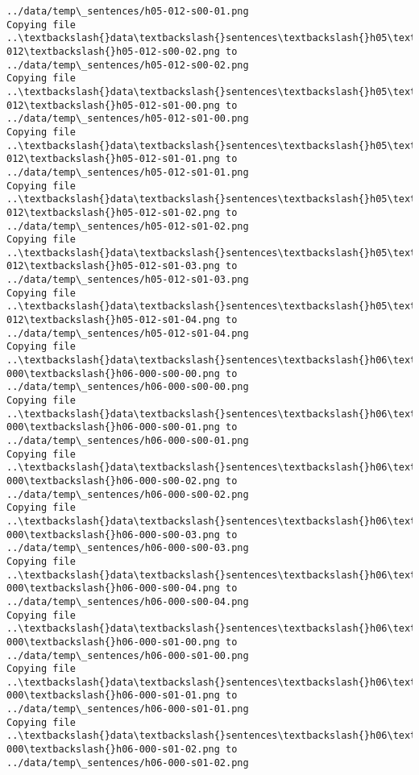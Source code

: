 \documentclass[11pt]{article}
\begin{document}
\begin{Verbatim}[commandchars=\\\{\}]
../data/temp\_sentences/h05-012-s00-01.png
Copying file ..\textbackslash{}data\textbackslash{}sentences\textbackslash{}h05\textbackslash{}h05-012\textbackslash{}h05-012-s00-02.png to
../data/temp\_sentences/h05-012-s00-02.png
Copying file ..\textbackslash{}data\textbackslash{}sentences\textbackslash{}h05\textbackslash{}h05-012\textbackslash{}h05-012-s01-00.png to
../data/temp\_sentences/h05-012-s01-00.png
Copying file ..\textbackslash{}data\textbackslash{}sentences\textbackslash{}h05\textbackslash{}h05-012\textbackslash{}h05-012-s01-01.png to
../data/temp\_sentences/h05-012-s01-01.png
Copying file ..\textbackslash{}data\textbackslash{}sentences\textbackslash{}h05\textbackslash{}h05-012\textbackslash{}h05-012-s01-02.png to
../data/temp\_sentences/h05-012-s01-02.png
Copying file ..\textbackslash{}data\textbackslash{}sentences\textbackslash{}h05\textbackslash{}h05-012\textbackslash{}h05-012-s01-03.png to
../data/temp\_sentences/h05-012-s01-03.png
Copying file ..\textbackslash{}data\textbackslash{}sentences\textbackslash{}h05\textbackslash{}h05-012\textbackslash{}h05-012-s01-04.png to
../data/temp\_sentences/h05-012-s01-04.png
Copying file ..\textbackslash{}data\textbackslash{}sentences\textbackslash{}h06\textbackslash{}h06-000\textbackslash{}h06-000-s00-00.png to
../data/temp\_sentences/h06-000-s00-00.png
Copying file ..\textbackslash{}data\textbackslash{}sentences\textbackslash{}h06\textbackslash{}h06-000\textbackslash{}h06-000-s00-01.png to
../data/temp\_sentences/h06-000-s00-01.png
Copying file ..\textbackslash{}data\textbackslash{}sentences\textbackslash{}h06\textbackslash{}h06-000\textbackslash{}h06-000-s00-02.png to
../data/temp\_sentences/h06-000-s00-02.png
Copying file ..\textbackslash{}data\textbackslash{}sentences\textbackslash{}h06\textbackslash{}h06-000\textbackslash{}h06-000-s00-03.png to
../data/temp\_sentences/h06-000-s00-03.png
Copying file ..\textbackslash{}data\textbackslash{}sentences\textbackslash{}h06\textbackslash{}h06-000\textbackslash{}h06-000-s00-04.png to
../data/temp\_sentences/h06-000-s00-04.png
Copying file ..\textbackslash{}data\textbackslash{}sentences\textbackslash{}h06\textbackslash{}h06-000\textbackslash{}h06-000-s01-00.png to
../data/temp\_sentences/h06-000-s01-00.png
Copying file ..\textbackslash{}data\textbackslash{}sentences\textbackslash{}h06\textbackslash{}h06-000\textbackslash{}h06-000-s01-01.png to
../data/temp\_sentences/h06-000-s01-01.png
Copying file ..\textbackslash{}data\textbackslash{}sentences\textbackslash{}h06\textbackslash{}h06-000\textbackslash{}h06-000-s01-02.png to
../data/temp\_sentences/h06-000-s01-02.png

\end{Verbatim}
\end{document}
